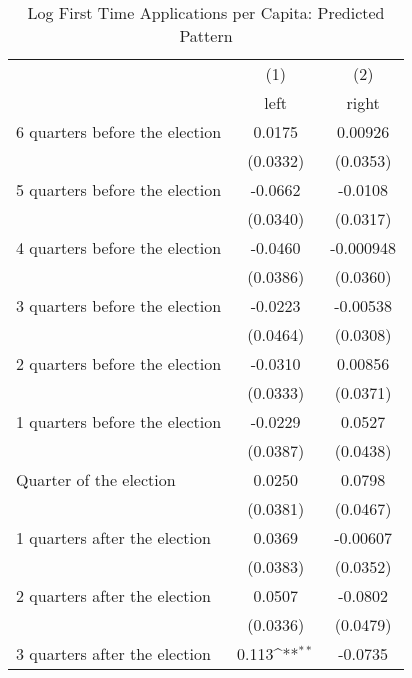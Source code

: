 \begin{table}[htbp]\centering
\def\sym#1{\ifmmode^{#1}\else\(^{#1}\)\fi}
\caption{Log First Time Applications per Capita: Predicted Pattern}
\begin{tabular}{l*{2}{c}}
\hline\hline
                    &\multicolumn{1}{c}{(1)}&\multicolumn{1}{c}{(2)}\\
                    &\multicolumn{1}{c}{left}&\multicolumn{1}{c}{right}\\
\hline
 6 quarters before the election&      0.0175         &     0.00926         \\
                    &    (0.0332)         &    (0.0353)         \\
[1em]
 5 quarters before the election&     -0.0662         &     -0.0108         \\
                    &    (0.0340)         &    (0.0317)         \\
[1em]
 4 quarters before the election&     -0.0460         &   -0.000948         \\
                    &    (0.0386)         &    (0.0360)         \\
[1em]
 3 quarters before the election&     -0.0223         &    -0.00538         \\
                    &    (0.0464)         &    (0.0308)         \\
[1em]
 2 quarters before the election&     -0.0310         &     0.00856         \\
                    &    (0.0333)         &    (0.0371)         \\
[1em]
 1 quarters before the election&     -0.0229         &      0.0527         \\
                    &    (0.0387)         &    (0.0438)         \\
[1em]
Quarter of the election&      0.0250         &      0.0798         \\
                    &    (0.0381)         &    (0.0467)         \\
[1em]
 1 quarters after the election&      0.0369         &    -0.00607         \\
                    &    (0.0383)         &    (0.0352)         \\
[1em]
 2 quarters after the election&      0.0507         &     -0.0802         \\
                    &    (0.0336)         &    (0.0479)         \\
[1em]
 3 quarters after the election&       0.113\sym{**} &     -0.0735         \\

\end{tabular}
\end{table}
